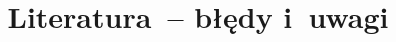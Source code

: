 \documentclass[a4paper,11pt]{article}
\title{Literatura~-- błędy i~uwagi}
\begin{document}





\maketitle %
















{}






\end{document}
